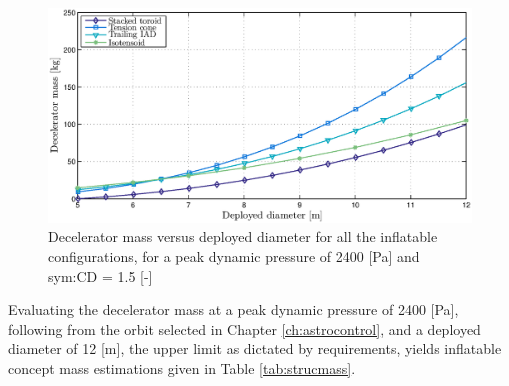 


\begin{figure}[H]
\includegraphics[width = 1.0\textwidth]{Figure/mass_dia_2300qmax.eps}
\caption{Decelerator mass versus deployed diameter for all the inflatable configurations, for a peak dynamic pressure of 2400 [Pa] and \gls{sym:CD} = 1.5 [-]}
\label{fig:mass_dia}
\end{figure}

Evaluating the decelerator mass at a peak dynamic pressure of 2400 [Pa], following from the orbit selected in Chapter \ref{ch:astrocontrol}, and a deployed diameter of 12 [m], the upper limit as dictated by requirements, yields inflatable concept mass estimations given in Table \ref{tab:strucmass}. 


